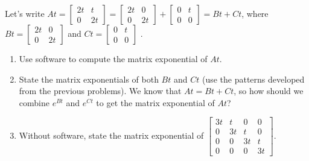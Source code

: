 \begin{problem}
 Let's write 
$At=
\begin{bmatrix}
2t & t\\
0 & 2t
\end{bmatrix}
=\begin{bmatrix}
2t & 0\\
0 & 2t
\end{bmatrix}
+
\begin{bmatrix}
0 & t\\
0 & 0
\end{bmatrix}
 = Bt+Ct$, 
where 
$Bt=
\begin{bmatrix}
2t & 0\\
0 & 2t
\end{bmatrix}
$ and 
$Ct=
\begin{bmatrix}
0 & t\\
0 & 0
\end{bmatrix}$
.
\begin{enumerate}
 \item {}%
Use software to compute the matrix exponential of $At$. 
 \item State the matrix exponentials of both $Bt$ and $Ct$ (use the patterns developed from the previous problems). We know that $At=Bt+Ct$, so how should we combine $e^{Bt}$ and $e^{Ct}$ to get the matrix exponential of $At$?
 \item Without software, state the matrix exponential of 
$
\begin{bmatrix}
3t& t &0&0\\
0 & 3t&t&0\\
0 & 0 &3t&t\\
0 & 0 &0&3t
\end{bmatrix}.
$
\end{enumerate}

\end{problem}


